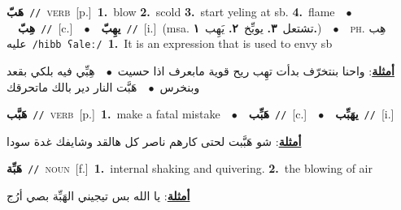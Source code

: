 \documentclass[10pt,a4paper,twoside]{article} %
\begin{document}
\begin{multicols}{2}
{\setlength\topsep{0pt}\textbf{\foreignlanguage{arabic}{هَبّ}}\ {\color{gray}\texttt{//}\color{black}}\ \textsc{verb}\ [p.]\ \textbf{1.}~blow  \textbf{2.}~scold  \textbf{3.}~start yeling at sb.  \textbf{4.}~flame\ \ $\bullet$\ \ \setlength\topsep{0pt}\textbf{\foreignlanguage{arabic}{هِبّ}}\ {\color{gray}\texttt{//}\color{black}}\ [c.]\ \ $\bullet$\ \ \setlength\topsep{0pt}\textbf{\foreignlanguage{arabic}{يهِبّ}}\ {\color{gray}\texttt{//}\color{black}}\ [i.]\ \color{gray}(msa. \foreignlanguage{arabic}{تشتعل}~\foreignlanguage{arabic}{\textbf{٣.}}  \foreignlanguage{arabic}{يوبِّخ}~\foreignlanguage{arabic}{\textbf{٢.}}  \foreignlanguage{arabic}{يَهِب}~\foreignlanguage{arabic}{\textbf{١.}})\color{black}\ \ $\bullet$\ \ \textsc{ph.} \color{gray} \foreignlanguage{arabic}{هِب عليه}\color{black}\ {\color{gray}\texttt{/{\sffamily hibb ʕaleː}/}\color{black}}\ \textbf{1.}~It is an expression that is used to envy sb\  \begin{flushright}\color{gray}\foreignlanguage{arabic}{\textbf{\underline{\foreignlanguage{arabic}{أمثلة}}}: واحنا بنتخرّف بدأت تهِب ريح قوية مابعرف اذا حسيت\ $\bullet$\ \  هِبِّي فيه بلكي بقعد وبنخرس\ $\bullet$\ \  هَبَّت النار دير بالك ماتحرقك}\end{flushright}\color{black}} \vspace{2mm}

{\setlength\topsep{0pt}\textbf{\foreignlanguage{arabic}{هَبَّب}}\ {\color{gray}\texttt{//}\color{black}}\ \textsc{verb}\ [p.]\ \textbf{1.}~make a fatal mistake\ \ $\bullet$\ \ \setlength\topsep{0pt}\textbf{\foreignlanguage{arabic}{هَبِّب}}\ {\color{gray}\texttt{//}\color{black}}\ [c.]\ \ $\bullet$\ \ \setlength\topsep{0pt}\textbf{\foreignlanguage{arabic}{يهَبِّب}}\ {\color{gray}\texttt{//}\color{black}}\ [i.]\  \begin{flushright}\color{gray}\foreignlanguage{arabic}{\textbf{\underline{\foreignlanguage{arabic}{أمثلة}}}: شو هَبَّبت لحتى كارهم ناصر كل هالقد وشايفك غدة سودا}\end{flushright}\color{black}} \vspace{2mm}

{\setlength\topsep{0pt}\textbf{\foreignlanguage{arabic}{هَبِّة}}\ {\color{gray}\texttt{//}\color{black}}\ \textsc{noun}\ [f.]\ \textbf{1.}~internal shaking and quivering.  \textbf{2.}~the blowing of air\  \begin{flushright}\color{gray}\foreignlanguage{arabic}{\textbf{\underline{\foreignlanguage{arabic}{أمثلة}}}: يا الله بس تيجيني الهَبِّة بصي أرُج}\end{flushright}\color{black}} \vspace{2mm}


\end{multicols}
\end{document}
